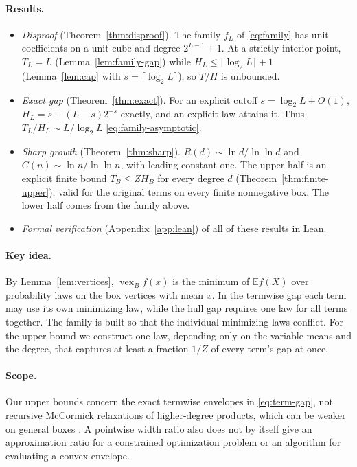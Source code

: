 \documentclass[11pt]{article}
\theoremstyle{remark}
\DeclareMathOperator{\vex}{vex}
\newcommand{\E}{\mathbb E}
\begin{document}
\paragraph{Results.}
\begin{itemize}
\item \emph{Disproof} (Theorem~\ref{thm:disproof}). The family
 $f_L$ of \eqref{eq:family} has unit coefficients on a unit cube and
 degree $2^{L-1}+1$. At a strictly interior point, $T_L=L$
 (Lemma~\ref{lem:family-gap}) while $H_L\le\lceil\log_2L\rceil+1$
 (Lemma~\ref{lem:cap} with $s=\lceil\log_2L\rceil$), so $T/H$ is
 unbounded.
\item \emph{Exact gap} (Theorem~\ref{thm:exact}). For an explicit cutoff
 $s=\log_2L+O(1)$, $H_L=s+(L-s)2^{-s}$ exactly, and an explicit law
 attains it. Thus $T_L/H_L\sim L/\log_2L$ \eqref{eq:family-asymptotic}.
\item \emph{Sharp growth} (Theorem~\ref{thm:sharp}).
 $R(d)\sim\ln d/\ln\ln d$ and $C(n)\sim\ln n/\ln\ln n$, with leading
 constant one. The upper half is an explicit finite bound
 $T_B\le ZH_B$ for every degree $d$ (Theorem~\ref{thm:finite-upper}),
 valid for the original terms on every finite nonnegative box. The lower
 half comes from the family above.
\item \emph{Formal verification} (Appendix~\ref{app:lean}) of all of
 these results in Lean.
\end{itemize}

\paragraph{Key idea.}
By Lemma~\ref{lem:vertices}, $\vex_Bf(x)$ is the minimum of $\E f(X)$
over probability laws on the box vertices with mean $x$. In the termwise
gap each term may use its own minimizing law, while the hull gap requires
one law for all terms together. The family is built so that the
individual minimizing laws conflict. For the upper bound we construct one
law, depending only on the variable means and the degree, that captures
at least a fraction $1/Z$ of every term's gap at once.

\paragraph{Scope.}
Our upper bounds concern the exact termwise envelopes in
\eqref{eq:term-gap}, not recursive McCormick relaxations of
higher-degree products, which can be weaker on general boxes
\citep{Luedtke2012}. A pointwise width ratio also does not by itself
give an approximation ratio for a constrained optimization problem or an
algorithm for evaluating a convex envelope.
\end{document}
